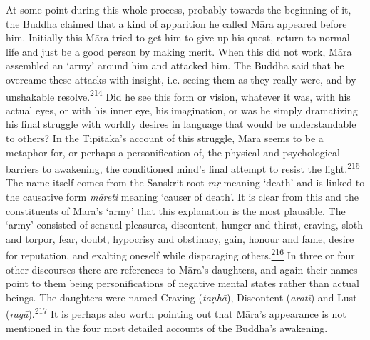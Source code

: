 At some point during this whole process, probably towards the beginning
of it, the Buddha claimed that a kind of apparition he called Māra
appeared before him. Initially this Māra tried to get him to give up his
quest, return to normal life and just be a good person by making merit.
When this did not work, Māra assembled an `army' around him and attacked
him. The Buddha said that he overcame these attacks with insight, i.e.
seeing them as they really were, and by unshakable
resolve.\label{footprints_split_009.html_fnref214}\hyperref[footprints_split_024.htmlux5cux23fn214]{\textsuperscript{214}}
Did he see this form or vision, whatever it was, with his actual eyes,
or with his inner eye, his imagination, or was he simply dramatizing his
final struggle with worldly desires in language that would be
understandable to others? In the Tipitaka's account of this struggle,
Māra seems to be a metaphor for, or perhaps a personification of, the
physical and psychological barriers to awakening, the conditioned mind's
final attempt to resist the
light.\label{footprints_split_009.html_fnref215}\hyperref[footprints_split_024.htmlux5cux23fn215]{\textsuperscript{215}}
The name itself comes from the Sanskrit root \emph{mṛ} meaning `death'
and is linked to the causative form \emph{māreti} meaning `causer of
death'. It is clear from this and the constituents of Māra's `army' that
this explanation is the most plausible. The `army' consisted of sensual
pleasures, discontent, hunger and thirst, craving, sloth and torpor,
fear, doubt, hypocrisy and obstinacy, gain, honour and fame, desire for
reputation, and exalting oneself while disparaging
others.\label{footprints_split_009.html_fnref216}\hyperref[footprints_split_024.htmlux5cux23fn216]{\textsuperscript{216}}
In three or four other discourses there are references to Māra's
daughters, and again their names point to them being personifications of
negative mental states rather than actual beings. The daughters were
named Craving (\emph{taṇhā}), Discontent (\emph{aratī}) and Lust
(\emph{ragā}).\label{footprints_split_009.html_fnref217}\hyperref[footprints_split_024.htmlux5cux23fn217]{\textsuperscript{217}}
It is perhaps also worth pointing out that Māra's appearance is not
mentioned in the four most detailed accounts of the Buddha's awakening.

